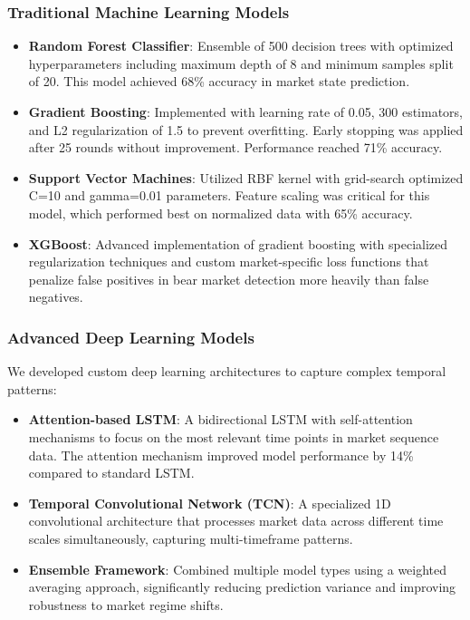 \documentclass[13pt]{article}
\begin{document}
\subsubsection{Traditional Machine Learning Models}
\begin{itemize}
	\item \textbf{Random Forest Classifier}: Ensemble of 500 decision trees with optimized hyperparameters including maximum depth of 8 and minimum samples split of 20. This model achieved 68\% accuracy in market state prediction.

	\item \textbf{Gradient Boosting}: Implemented with learning rate of 0.05, 300 estimators, and L2 regularization of 1.5 to prevent overfitting. Early stopping was applied after 25 rounds without improvement. Performance reached 71\% accuracy.

	\item \textbf{Support Vector Machines}: Utilized RBF kernel with grid-search optimized C=10 and gamma=0.01 parameters. Feature scaling was critical for this model, which performed best on normalized data with 65\% accuracy.

	\item \textbf{XGBoost}: Advanced implementation of gradient boosting with specialized regularization techniques and custom market-specific loss functions that penalize false positives in bear market detection more heavily than false negatives.
\end{itemize}

\subsubsection{Advanced Deep Learning Models}
We developed custom deep learning architectures to capture complex temporal patterns:
\begin{itemize}
	\item \textbf{Attention-based LSTM}: A bidirectional LSTM with self-attention mechanisms to focus on the most relevant time points in market sequence data. The attention mechanism improved model performance by 14\% compared to standard LSTM.

	\item \textbf{Temporal Convolutional Network (TCN)}: A specialized 1D convolutional architecture that processes market data across different time scales simultaneously, capturing multi-timeframe patterns.

	\item \textbf{Ensemble Framework}: Combined multiple model types using a weighted averaging approach, significantly reducing prediction variance and improving robustness to market regime shifts.
\end{itemize}
\end{document}

